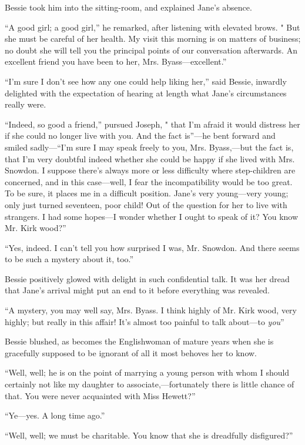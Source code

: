 Bessie took him into the sitting-room, and explained Jane's absence.

``A good girl; a good girl,'' he remarked, after listening with elevated
brows. " But she must be careful of her health. My visit this morning is
on matters of business; no doubt she will tell you the principal points
of our conversation afterwards. An excellent friend you have been to
her, Mrs. Byass---excellent.''

{}``I'm sure I don't see how any one could help liking her,'' said
Bessie, inwardly delighted with the expectation of hearing at length
what Jane's circumstances really were.

``Indeed, so good a friend,'' pursued Joseph, " that I'm afraid it would
distress her if she could no longer live with you. And the fact
is''---he bent forward and smiled sadly---``I'm sure I may speak freely
to you, Mrs. Byass,---but the fact is, that I'm very doubtful indeed
whether she could be happy if she lived with Mrs. Snowdon. I suppose
there's always more or less difficulty where step-children are
concerned, and in this case---well, I fear the incompatibility would be
too great. To be sure, it places me in a difficult position. Jane's very
young---very young; only just turned seventeen, poor child! Out of the
question for her to live with strangers. I had some hopes---I wonder
whether I ought to speak of it? You know Mr. Kirk wood?''

``Yes, indeed. I can't tell you how surprised I was, Mr. Snowdon. And
there seems to be such a mystery about it, too.''

Bessie positively glowed with delight in such confidential talk. It was
her dread that {}Jane's arrival might put an end to it before everything
was revealed.

``A mystery, you may well say, Mrs. Byass. I think highly of Mr. Kirk
wood, very highly; but really in this affair! It's almost too painful to
talk about---to \emph{you}''

Bessie blushed, as becomes the Englishwoman of mature years when she is
gracefully supposed to be ignorant of all it most behoves her to know.

``Well, well; he is on the point of marrying a young person with whom I
should certainly not like my daughter to associate,---fortunately there
is little chance of that. You were never acquainted with Miss Hewett?''

``Ye---yes. A long time ago.''

``Well, well; we must be charitable. You know that she is dreadfully
disfigured?''

